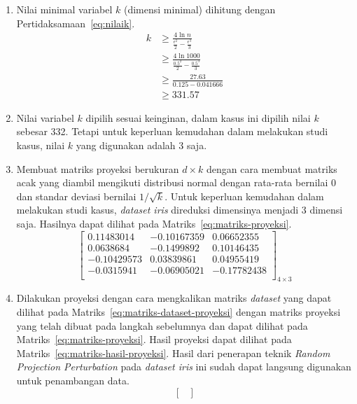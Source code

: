 \begin{enumerate}
    \item Nilai minimal variabel \(k\) (dimensi minimal) dihitung dengan Pertidaksamaan~\ref{eq:nilaik}.
    \begin{align*}
        k &\geq \frac{4\ln{n}}{\frac{\epsilon^{2}}{2}-\frac{\epsilon^{3}}{3}} \\
        &\geq \frac{4\ln{1000}}{\frac{0.5^{2}}{2}-\frac{0.5^{3}}{3}} \\
        &\geq \frac{27.63}{0.125-0.041666} \\
        &\geq 331.57
    \end{align*}
    \item Nilai variabel \(k\) dipilih sesuai keinginan, dalam kasus ini dipilih nilai \(k\) sebesar 332. Tetapi untuk keperluan kemudahan dalam melakukan studi kasus, nilai \(k\) yang digunakan adalah 3 saja.
    \item Membuat matriks proyeksi berukuran \(d \times k\) dengan cara membuat matriks acak yang diambil mengikuti distribusi normal dengan rata-rata bernilai 0 dan standar deviasi bernilai \(1/\sqrt{k}\). Untuk keperluan kemudahan dalam melakukan studi kasus, \textit{dataset iris} direduksi dimensinya menjadi 3 dimensi saja. Hasilnya dapat dilihat pada Matriks~\ref{eq:matriks-proyeksi}.
    \begin{equation}\label{eq:matriks-proyeksi}
        \begin{bmatrix}
        0.11483014 &  -0.10167359  &  0.06652355 \\
        0.0638684 &   -0.1499892   &  0.10146435 \\
        -0.10429573 &   0.03839861 &   0.04955419 \\
        -0.0315941  &  -0.06905021  & -0.17782438 \\
        \end{bmatrix}_{4\times 3}
    \end{equation}
    \item Dilakukan proyeksi dengan cara mengkalikan matriks \textit{dataset} yang dapat dilihat pada Matriks~\ref{eq:matriks-dataset-proyeksi} dengan matriks proyeksi yang telah dibuat pada langkah sebelumnya dan dapat dilihat pada Matriks~\ref{eq:matriks-proyeksi}. Hasil proyeksi dapat dilihat pada Matriks~\ref{eq:matriks-hasil-proyeksi}. Hasil dari penerapan teknik \textit{Random Projection Perturbation} pada \textit{dataset iris} ini sudah dapat langsung digunakan untuk penambangan data.
    \begin{equation}\label{eq:matriks-hasil-proyeksi}
        \begin{bmatrix}

\end{bmatrix}
\end{equation}
\end{enumerate}
